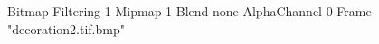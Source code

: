{Bitmap
	{Filtering 1}
	{Mipmap 1}
	{Blend none}
	{AlphaChannel 0}
	{Frame "decoration2.tif.bmp"}
}
